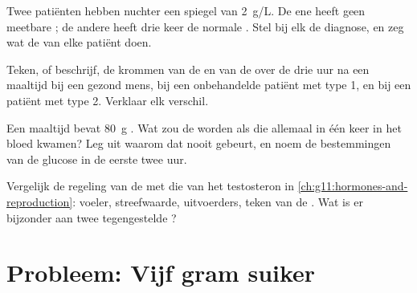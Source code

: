 \begin{exercise}[$\star\star\star$]\label{exo:g12:glucose-and-diabetes:12}
Twee patiënten hebben nuchter een spiegel van \qty{2}{g/L}. De ene heeft
geen meetbare ; de andere heeft drie keer de normale .
Stel bij elk de diagnose, en zeg wat de  van elke patiënt doen.
\end{exercise}

\begin{exercise}[$\star\star\star$]\label{exo:g12:glucose-and-diabetes:13}
Teken, of beschrijf, de krommen van de  en van de 
over de drie uur na een maaltijd bij een gezond mens, bij een onbehandelde
patiënt met type 1, en bij een patiënt met type 2. Verklaar elk verschil.
\end{exercise}

\begin{exercise}[$\star\star\star$]\label{exo:g12:glucose-and-diabetes:14}
Een maaltijd bevat \qty{80}{g} . Wat zou de
 worden als die allemaal in één keer in het bloed
kwamen? Leg uit waarom dat nooit gebeurt, en noem de bestemmingen van de
glucose in de eerste twee uur.
\end{exercise}

\begin{exercise}[$\star\star\star$]\label{exo:g12:glucose-and-diabetes:15}
Vergelijk de regeling van de  met die van het testosteron in
\cref{ch:g11:hormones-and-reproduction}: voeler, streefwaarde,
uitvoerders, teken van de . Wat is er bijzonder aan twee
tegengestelde ?
\end{exercise}

\section{Probleem: Vijf gram suiker}

